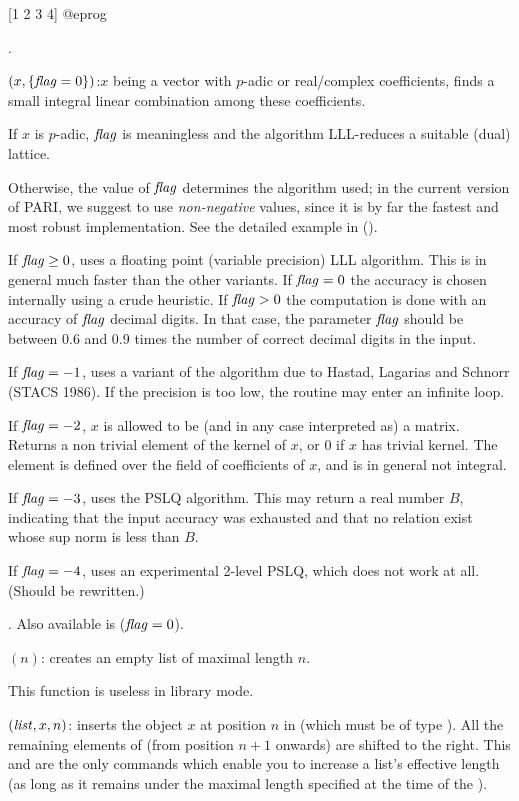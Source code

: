 [1 2 3 4]
@eprog

.

$(x,\{\hbox{\it f\kern0pt lag\/}=0\})$:$x$ being a
vector with $p$-adic or real/complex coefficients, finds a small integral
linear combination among these coefficients.

If $x$ is $p$-adic, $\hbox{\it f\kern0pt lag\/}$ is meaningless and the algorithm LLL-reduces a
suitable (dual) lattice.

Otherwise, the value of $\hbox{\it f\kern0pt lag\/}$ determines the algorithm used; in the current
version of PARI, we suggest to use \emph{non-negative} values, since it is by
far the fastest and most robust implementation. See the detailed example in
 ().

If $\hbox{\it f\kern0pt lag\/}\geq 0$, uses a floating point (variable precision) LLL algorithm.
This is in general much faster than the other variants. 
If $\hbox{\it f\kern0pt lag\/} = 0$ the accuracy is chosen internally using a crude heuristic.
If $\hbox{\it f\kern0pt lag\/} > 0$ the computation is done with an accuracy of $\hbox{\it f\kern0pt lag\/}$ decimal digits.
In that case, the parameter $\hbox{\it f\kern0pt lag\/}$ should be between 0.6 and 0.9 times the
number of correct decimal digits in the input.

If $\hbox{\it f\kern0pt lag\/}=-1$, uses a variant of the  algorithm due to Hastad,
Lagarias and Schnorr (STACS 1986). If the precision is too low, the routine
may enter an infinite loop.

If $\hbox{\it f\kern0pt lag\/}=-2$, $x$ is allowed to be (and in any case interpreted as) a matrix.
Returns a non trivial element of the kernel of $x$, or $0$ if $x$ has trivial
kernel. The element is defined over the field of coefficients of $x$, and is
in general not integral.

If $\hbox{\it f\kern0pt lag\/}=-3$, uses the PSLQ algorithm. This may return a real number $B$,
indicating that the input accuracy was exhausted and that no relation exist
whose sup norm is less than $B$.

If $\hbox{\it f\kern0pt lag\/}=-4$, uses an experimental 2-level PSLQ, which does not work at all.
(Should be rewritten.)

. Also available is
 ($\hbox{\it f\kern0pt lag\/}=0$).

$(n)$: creates an empty list of maximal length $n$.

This function is useless in library mode.

$(\hbox{\it list\/},x,n)$: inserts the object $x$ at
position $n$ in  (which must be of type ). All the
remaining elements of  (from position $n+1$ onwards) are shifted
to the right. This and  are the only commands which enable
you to increase a list's effective length (as long as it remains under
the maximal length specified at the time of the ).

